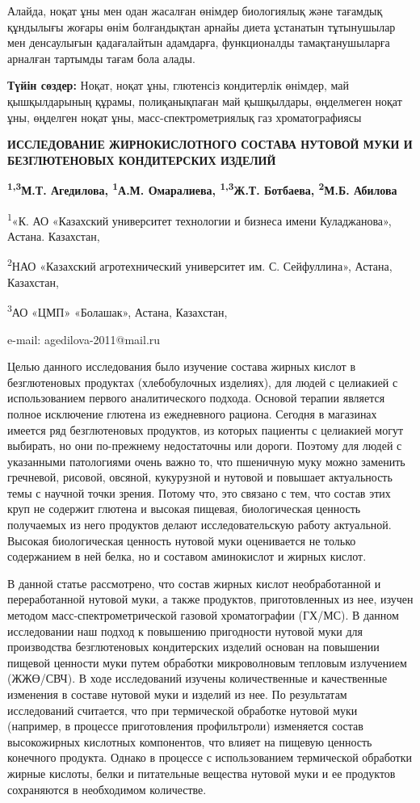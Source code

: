 Алайда, ноқат ұны мен одан жасалған өнімдер биологиялық және тағамдық
құндылығы жоғары өнім болғандықтан арнайы диета ұстанатын тұтынушылар
мен денсаулығын қадағалайтын адамдарға, функционалды тамақтанушыларға
арналған тартымды тағам бола алады.

{\bfseries Түйін сөздер:} Ноқат, ноқат ұны, глютенсіз кондитерлік өнімдер,
май қышқылдарының құрамы, полиқанықпаған май қышқылдары, өңделмеген
ноқат ұны, өңделген ноқат ұны, масс-спектрометриялық газ хроматографиясы

{\bfseries ИССЛЕДОВАНИЕ ЖИРНОКИСЛОТНОГО СОСТАВА НУТОВОЙ МУКИ И
БЕЗГЛЮТЕНОВЫХ КОНДИТЕРСКИХ ИЗДЕЛИЙ}

{\bfseries \textsuperscript{1,3}М.Т. Агедилова\textsuperscript{\envelope },
\textsuperscript{1}А.М. Омаралиева, \textsuperscript{1,3}Ж.Т. Ботбаева,
\textsuperscript{2}М.Б. Абилова}

\textsuperscript{1}«К. АО «Казахский университет технологии и бизнеса
имени Куладжанова», Астана. Казахстан,

\textsuperscript{2}НАО «Казахский агротехнический университет им. С.
Сейфуллина», Астана, Казахстан,

\textsuperscript{3}АО «ЦМП» «Болашак», Астана, Казахстан,

e-mail: agedilova-2011@mail.ru

Целью данного исследования было изучение состава жирных кислот в
безглютеновых продуктах (хлебобулочных изделиях), для людей с целиакией
с использованием первого аналитического подхода. Основой терапии
является полное исключение глютена из ежедневного рациона. Сегодня в
магазинах имеется ряд безглютеновых продуктов, из которых пациенты с
целиакией могут выбирать, но они по-прежнему недостаточны или дороги.
Поэтому для людей с указанными патологиями очень важно то, что пшеничную
муку можно заменить гречневой, рисовой, овсяной, кукурузной и нутовой и
повышает актуальность темы с научной точки зрения. Потому что, это
связано с тем, что состав этих круп не содержит глютена и высокая
пищевая, биологическая ценность получаемых из него продуктов делают
исследовательскую работу актуальной. Высокая биологическая ценность
нутовой муки оценивается не только содержанием в ней белка, но и
составом аминокислот и жирных кислот.

В данной статье рассмотрено, что состав жирных кислот необработанной и
переработанной нутовой муки, а также продуктов, приготовленных из нее,
изучен методом масс-спектрометрической газовой хроматографии (ГХ/МС). В
данном исследовании наш подход к повышению пригодности нутовой муки для
производства безглютеновых кондитерских изделий основан на повышении
пищевой ценности муки путем обработки микроволновым тепловым излучением
(ЖЖӨ/СВЧ). В ходе исследований изучены количественные и качественные
изменения в составе нутовой муки и изделий из нее. По результатам
исследований считается, что при термической обработке нутовой муки
(например, в процессе приготовления профильтроли) изменяется состав
высокожирных кислотных компонентов, что влияет на пищевую ценность
конечного продукта. Однако в процессе с использованием термической
обработки жирные кислоты, белки и питательные вещества нутовой муки и ее
продуктов сохраняются в необходимом количестве.

